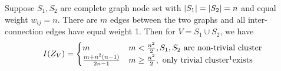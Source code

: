 \begin{proposition}\label{prop:reweight}
Suppose $S_1, S_2 $ are complete graph node set with $\lvert S_1\rvert=\lvert S_2\rvert=n$ and equal weight $w_{ij}=n$. There are $m$ edges between the two graphs and all inter-connection edges have equal weight 1. Then for $V=S_1\cup S_2$, we have
\begin{equation}
I(Z_V) = \begin{cases}
m & m <\frac{n^2}{2}, S_1,S_2 \textrm{ are non-trivial cluster} \\
\frac{m+n^2(n-1)}{2n-1} & m\geq \frac{n^2}{2}, \textrm{ only trivial cluster\footnotemark exists} 
\end{cases}
\end{equation}
\end{proposition}
